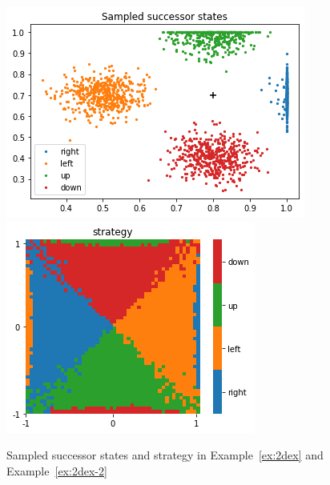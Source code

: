 \documentclass{llncs}
\begin{document}
\begin{figure}
\centering
\includegraphics[scale=0.4]{./Figures/successorstates.png}\hspace{5mm}
\includegraphics[scale=0.4]{./Figures/strategy.png}
\caption{Sampled successor states and strategy in Example~\ref{ex:2dex} and Example~\ref{ex:2dex-2}
\label{fig:succstates}}
\end{figure}
\end{document}
